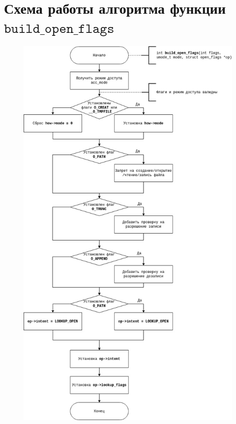 \documentclass[12pt]{report}
\begin{document}
\section{Схема работы алгоритма функции $\texttt{build\_open\_flags}$}

\begin{figure}[H]
	\centering
	\includegraphics[scale=0.5]{img/build_open_flags.jpg}
	\label{fig:open_open_flags}
\end{figure}
\end{document}
